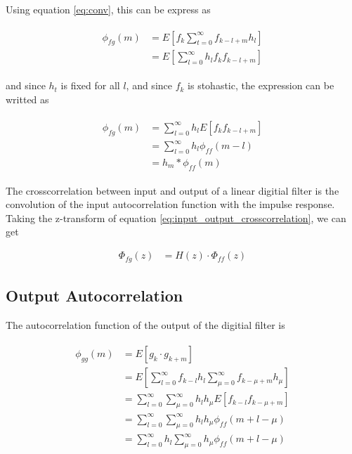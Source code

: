 \documentclass[8pt,a4paper]{article}
\begin{document}
\begin{multicols}{2}
Using equation \ref{eq:conv}, this can be express as

\begin{align}
  \begin{split}
    \phi_{fg}(m) &= E \left[ f_{k} \sum_{t=0}^{\infty} f_{k-l+m}h_{l} \right]\\
    &= E \left[ \sum_{l=0}^{\infty} h_{l} f_{k} f_{k-l+m} \right]
  \end{split}
\end{align}

and since $h_{t}$ is fixed for all $ l $, and since $f_{k}$ is stohastic, the expression can be writted as

\begin{align}
  \label{eq:input_output_crosscorrelation}
  \begin{split}
    \phi_{fg}(m) &= \sum_{l=0}^{\infty} h_{l} E \left[ f_{k} f_{k-l+m} \right] \\
    &= \sum_{l=0}^{\infty} h_{l} \phi_{ff}(m-l) \\
    &= h_{m} * \phi_{ff}(m)
  \end{split}
\end{align}

The crosscorrelation between input and output of a linear digitial filter is the convolution of the input autocorrelation function with the impulse response.
Taking the z-transform of equation \ref{eq:input_output_crosscorrelation}, we can get 

\begin{align}
  \Phi_{fg}(z)&=H(z) \cdot \Phi_{ff}(z)
\end{align}

\subsection*{Output Autocorrelation}
The autocorrelation function of the output of the digitial filter is

\begin{align}
  \label{eq:output_autocorrelation}
  \begin{split}
    \phi_{gg}(m)&= E \left[ g_{k} \cdot g_{k+m} \right] \\
                &= E \left[  \sum_{l=0}^{\infty} f_{k-l}h_{l} \sum_{\mu=0}^{\infty} f_{k-\mu+m}h_{\mu}  \right] \\
                &= \sum_{l=0}^{\infty} \sum_{\mu=0}^{\infty} h_{l} h_{\mu} E \left[ f_{k-l} f_{k-\mu +m} \right] \\
                &= \sum_{l=0}^{\infty} \sum_{\mu=0}^{\infty} h_{l} h_{\mu} \phi_{ff}(m+l-\mu) \\
                &= \sum_{l=0}^{\infty} h_{l} \sum_{\mu=0}^{\infty} h_{\mu} \phi_{ff}(m+l-\mu)
  \end{split}
\end{align}


\end{multicols}
\end{document}
